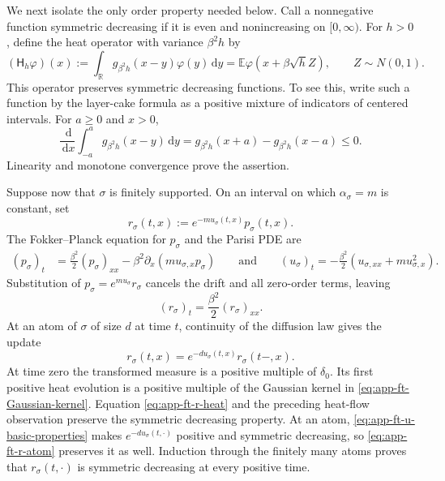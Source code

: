 \documentclass[10pt]{amsart}
\theoremstyle{definition}
\theoremstyle{remark}
\numberwithin{equation}{section}
\newcommand{\R}{\mathbb R}
\newcommand{\E}{\mathbb E}
\newcommand{\1}{\mathbf 1}
\newcommand{\dd}{\,\mathrm d}
\begin{document}
We next isolate the only order property needed below.  Call a nonnegative function symmetric decreasing if it is even and nonincreasing on $[0,\infty)$.  For $h>0$, define the heat operator with variance $\beta^2h$ by
\begin{equation}
 (\mathsf H_h\varphi)(x)
 :=\int_\R g_{\beta^2h}(x-y)\varphi(y)\dd y
 =\E\varphi(x+\beta\sqrt h Z),
 \qquad Z\sim N(0,1).
 \label{eq:app-ft-heat-convention}
\end{equation}
This operator preserves symmetric decreasing functions.  To see this, write such a function by the layer-cake formula as a positive mixture of indicators of centered intervals.  For $a\geq0$ and $x>0$,
\begin{equation*}
 \frac{\dd}{\dd x}
 \int_{-a}^ag_{\beta^2h}(x-y)\dd y
 =g_{\beta^2h}(x+a)-g_{\beta^2h}(x-a)\leq0.
\end{equation*}
Linearity and monotone convergence prove the assertion.

Suppose now that $\sigma$ is finitely supported.  On an interval on which $\alpha_\sigma=m$ is constant, set
\begin{equation*}
 r_\sigma(t,x)
 :=e^{-m u_\sigma(t,x)}p_\sigma(t,x).
\end{equation*}
The Fokker--Planck equation for $p_\sigma$ and the Parisi PDE are
\begin{align*}
 (p_\sigma)_t
 &=\frac{\beta^2}{2}(p_\sigma)_{xx}
   -\beta^2\partial_x(mu_{\sigma,x}p_\sigma)\qquad\text{and}\qquad
 (u_\sigma)_t
 =-\frac{\beta^2}{2}
   (u_{\sigma,xx}+mu_{\sigma,x}^2).
\end{align*}
Substitution of $p_\sigma=e^{mu_\sigma}r_\sigma$ cancels the drift and all zero-order terms, leaving
\begin{equation}
 (r_\sigma)_t=\frac{\beta^2}{2}(r_\sigma)_{xx}.
 \label{eq:app-ft-r-heat}
\end{equation}
At an atom of $\sigma$ of size $d$ at time $t$, continuity of the diffusion law gives the update
\begin{equation}
 r_\sigma(t,x)
 =e^{-d u_\sigma(t,x)}r_\sigma(t-,x).
 \label{eq:app-ft-r-atom}
\end{equation}
At time zero the transformed measure is a positive multiple of $\delta_0$.  Its first positive heat evolution is a positive multiple of the Gaussian kernel in \eqref{eq:app-ft-Gaussian-kernel}.  Equation \eqref{eq:app-ft-r-heat} and the preceding heat-flow observation preserve the symmetric decreasing property.  At an atom, \eqref{eq:app-ft-u-basic-properties} makes $e^{-d u_\sigma(t,\cdot)}$ positive and symmetric decreasing, so \eqref{eq:app-ft-r-atom} preserves it as well.  Induction through the finitely many atoms proves that $r_\sigma(t,\cdot)$ is symmetric decreasing at every positive time.
\end{document}
